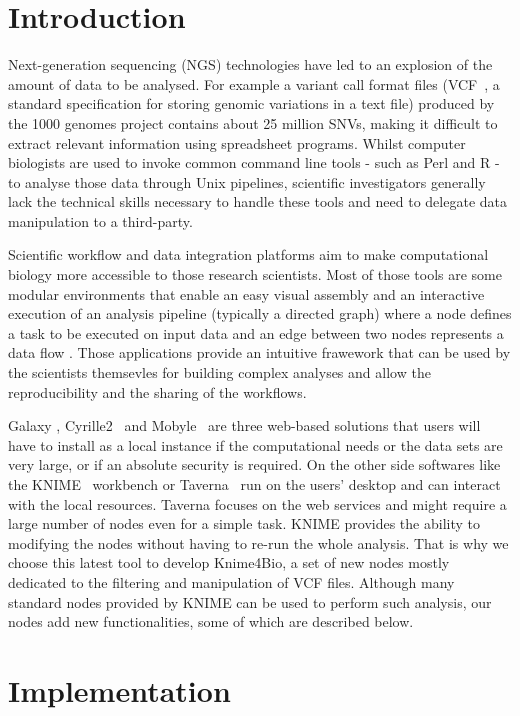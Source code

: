 \documentclass{bioinfo}
\begin{document}
\section{Introduction}

Next-generation sequencing (NGS) technologies have led to an explosion of the amount of data to be analysed. For example a variant call format files (VCF~\citep{pmid21653522}, a standard specification for storing genomic variations in a text file)  produced by the 1000 genomes project contains about 25 million SNVs, making it difficult to extract relevant information using spreadsheet programs. Whilst computer biologists are used to invoke common command line tools - such as Perl and R - to analyse those data through Unix pipelines, scientific investigators generally lack the technical skills necessary to handle these tools and need to delegate data manipulation to a third-party. 

Scientific workflow and data integration platforms aim to make computational biology more accessible to those research scientists. Most of those tools are some modular environments that enable an easy visual assembly and an interactive execution of an analysis pipeline (typically a directed graph) where a node defines a task to be executed on input data and an edge between two nodes represents a data flow . Those applications provide an intuitive frawework that can be used by the scientists themsevles for building complex analyses and allow the reproducibility and the sharing of the workflows.

Galaxy \citep{pmid21531983}, Cyrille2~\citep{pmid18269742} and Mobyle~\citep{pmid19689959} are three web-based solutions that users will have to install as a local instance if the computational needs or the data sets are very large, or if an absolute security is required. On the other side softwares like the KNIME~\citep{knimeref} workbench or Taverna~\citep{pmid16845108}  run on the users' desktop and can interact with the local resources. Taverna focuses on the web services and might require a large number of nodes even for a simple task. KNIME provides the ability to modifying the nodes without having to re-run the whole analysis. That is why we choose this latest tool to develop Knime4Bio, a set of new nodes mostly dedicated to the filtering and manipulation of VCF files. Although many standard nodes provided by KNIME can be used to perform such analysis, our nodes add new functionalities, some of which are described below. 

\section{Implementation}
\end{document}
